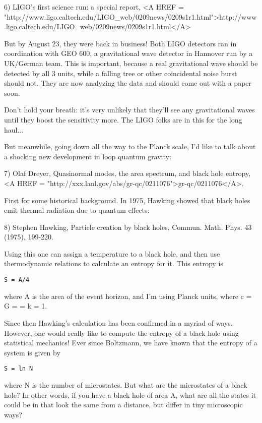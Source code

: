 6) LIGO's first science run: a special report,
<A HREF = "http://www.ligo.caltech.edu/LIGO_web/0209news/0209s1r1.html">http://www.ligo.caltech.edu/LIGO_web/0209news/0209s1r1.html</A>

But by August 23, they were back in business!  Both LIGO detectors ran
in coordination with GEO 600, a gravitational wave detector in Hannover
run by a UK/German team.   
This is important, because a real gravitational wave should be detected
by all 3 units, while a falling tree or other coincidental noise burst
should not.  They are now analyzing the data and should come out with a
paper soon.  

Don't hold your breath: it's very unlikely that they'll see any
gravitational waves until they boost the sensitivity more.  The
LIGO folks are in this for the long haul...

But meanwhile, going down all the way to the Planck scale, I'd like to
talk about a shocking new development in loop quantum gravity:


 7) Olaf Dreyer, Quasinormal modes, the area spectrum, and black hole
entropy, <A HREF = "http://xxx.lanl.gov/abs/gr-qc/0211076">gr-qc/0211076</A>.

First for some historical background.  In 1975, Hawking showed that
black holes emit thermal radiation due to quantum effects:

8) Stephen Hawking, Particle creation by black holes, Commun. Math. 
Phys. 43 (1975), 199-220.

Using this one can assign a temperature to a black hole, and then use
thermodynamic relations to calculate an entropy for it.  This entropy is

\begin{verbatim}
S = A/4
\end{verbatim}
    
where A is the area of the event horizon, and I'm using Planck units,
where c = G = \hbar  = k = 1.

Since then Hawking's calculation has been confirmed in a myriad of ways.
However, one would really like to compute the entropy of a black hole
using statistical mechanics!  Ever since Boltzmann, we have known that
the entropy of a system is given by

\begin{verbatim}
S = ln N
\end{verbatim}
    
where N is the number of microstates.  But what are the microstates of a
black hole?  In other words, if you have a black hole of area A, what
are all the states it could be in that look the same from a distance,
but differ in tiny microscopic ways?

